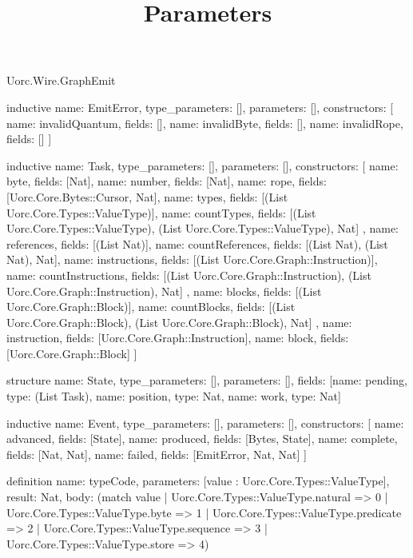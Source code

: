 \begin{lexlean}{Uorc.Wire.GraphEmit}
\title{Parameters}
\begin{semanticmodule}
inductive{
  name: EmitError,
  type_parameters: [],
  parameters: [],
  constructors: [
    {name: invalidQuantum, fields: []},
    {name: invalidByte, fields: []},
    {name: invalidRope, fields: []}
  ]
}

inductive{
  name: Task,
  type_parameters: [],
  parameters: [],
  constructors: [
    {name: byte, fields: [Nat]},
    {name: number, fields: [Nat]},
    {name: rope, fields: [Uorc.Core.Bytes::Cursor, Nat]},
    {name: types, fields: [(List Uorc.Core.Types::ValueType)]},
    {
      name: countTypes,
      fields: [(List Uorc.Core.Types::ValueType), (List Uorc.Core.Types::ValueType), Nat]
    },
    {name: references, fields: [(List Nat)]},
    {name: countReferences, fields: [(List Nat), (List Nat), Nat]},
    {name: instructions, fields: [(List Uorc.Core.Graph::Instruction)]},
    {
      name: countInstructions,
      fields: [(List Uorc.Core.Graph::Instruction), (List Uorc.Core.Graph::Instruction), Nat]
    },
    {name: blocks, fields: [(List Uorc.Core.Graph::Block)]},
    {
      name: countBlocks,
      fields: [(List Uorc.Core.Graph::Block), (List Uorc.Core.Graph::Block), Nat]
    },
    {name: instruction, fields: [Uorc.Core.Graph::Instruction]},
    {name: block, fields: [Uorc.Core.Graph::Block]}
  ]
}

structure{
  name: State,
  type_parameters: [],
  parameters: [],
  fields: [{name: pending, type: (List Task)}, {name: position, type: Nat}, {name: work, type: Nat}]
}

inductive{
  name: Event,
  type_parameters: [],
  parameters: [],
  constructors: [
    {name: advanced, fields: [State]},
    {name: produced, fields: [Bytes, State]},
    {name: complete, fields: [Nat, Nat]},
    {name: failed, fields: [EmitError, Nat, Nat]}
  ]
}

definition{
  name: typeCode,
  parameters: [value : Uorc.Core.Types::ValueType],
  result: Nat,
  body: (match value
    | Uorc.Core.Types::ValueType.natural => 0
    | Uorc.Core.Types::ValueType.byte => 1
    | Uorc.Core.Types::ValueType.predicate => 2
    | Uorc.Core.Types::ValueType.sequence => 3
    | Uorc.Core.Types::ValueType.store => 4)
}


\end{semanticmodule}
\end{lexlean}
